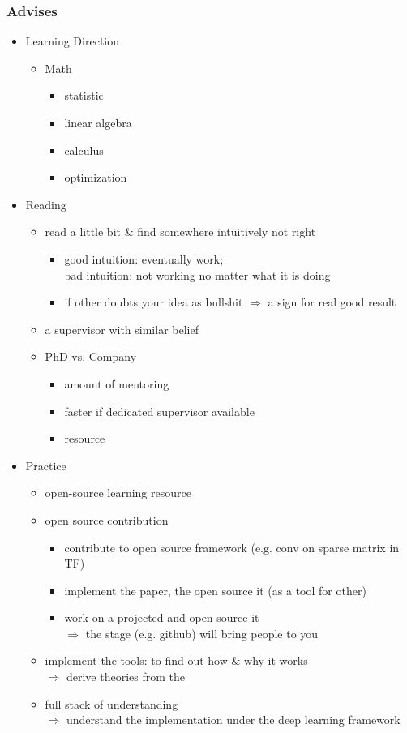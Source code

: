 \subsubsection{Advises}
\begin{itemize}
\item Learning Direction
	\begin{itemize}
	\item Math
		\begin{itemize}
		\item statistic
		\item linear algebra
		\item calculus
		\item optimization
		\end{itemize}
	\end{itemize}
\item Reading
	\begin{itemize}
	\item read a little bit \& find somewhere intuitively not right
	\begin{itemize}
		\item good intuition: eventually work; \\ 
		bad intuition: not working no matter what it is doing
		\item if other doubts your idea as bullshit $\Rightarrow$ a sign for real good result
	\end{itemize}
	\item a supervisor with similar belief
	\item PhD vs. Company
		\begin{itemize}
		\item amount of mentoring
		\item faster if dedicated supervisor available
		\item resource
		\end{itemize}
	\end{itemize}

\item Practice
	\begin{itemize}
	\item open-source learning resource
	\item open source contribution
		\begin{itemize}
		\item contribute to open source framework (e.g. conv on sparse matrix in TF)
		\item implement the paper, the open source it (as a tool for other)
		\item work on a projected and open source it \\
		$\Rightarrow$ the stage (e.g. github) will bring people to you
		\end{itemize}
	\item implement the tools: to find out how \& why it works \\
	$\Rightarrow$ derive theories from the 
	\item full stack of understanding \\ 
	$\Rightarrow$ understand the implementation under the deep learning framework
	\end{itemize}
\end{itemize}

